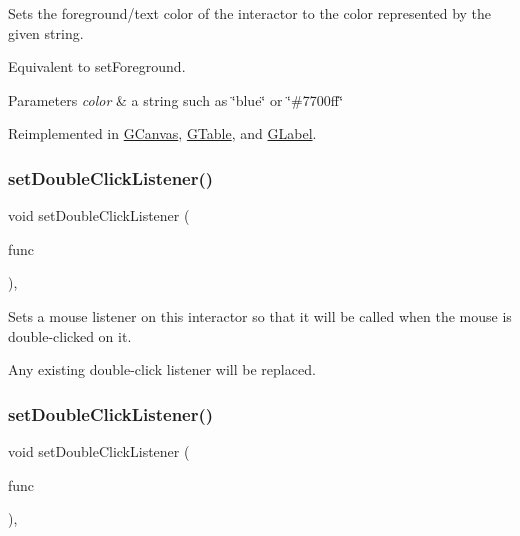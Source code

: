 Sets the foreground/text color of the interactor to the color represented by the given string. 

Equivalent to set\+Foreground. 
\begin{DoxyParams}{Parameters}
{\em color} & a string such as \char`\"{}blue\char`\"{} or \char`\"{}\#7700ff\char`\"{} \\
\hline
\end{DoxyParams}


Reimplemented in \mbox{\hyperlink{classGCanvas_a56845b1accc47aa881d05939eef6996c}{G\+Canvas}}, \mbox{\hyperlink{classGTable_a56845b1accc47aa881d05939eef6996c}{G\+Table}}, and \mbox{\hyperlink{classGLabel_a56845b1accc47aa881d05939eef6996c}{G\+Label}}.

\mbox{\label{classGInteractor_ac29f9a3462458e165fae3a1f046ee77a}} 
\subsubsection{\texorpdfstring{set\+Double\+Click\+Listener()}{setDoubleClickListener()}\hspace{0.1cm}{\footnotesize\ttfamily [1/2]}}
{\footnotesize\ttfamily void set\+Double\+Click\+Listener (\begin{DoxyParamCaption}\item[{G\+Event\+Listener}]{func }\end{DoxyParamCaption})\hspace{0.3cm}{\ttfamily [virtual]}, {\ttfamily [inherited]}}



Sets a mouse listener on this interactor so that it will be called when the mouse is double-\/clicked on it. 

Any existing double-\/click listener will be replaced. \mbox{\label{classGInteractor_a50096194d66f48c92dd4c512d41bfc76}} 
\subsubsection{\texorpdfstring{set\+Double\+Click\+Listener()}{setDoubleClickListener()}\hspace{0.1cm}{\footnotesize\ttfamily [2/2]}}
{\footnotesize\ttfamily void set\+Double\+Click\+Listener (\begin{DoxyParamCaption}\item[{G\+Event\+Listener\+Void}]{func }\end{DoxyParamCaption})\hspace{0.3cm}{\ttfamily [virtual]}, {\ttfamily [inherited]}}



